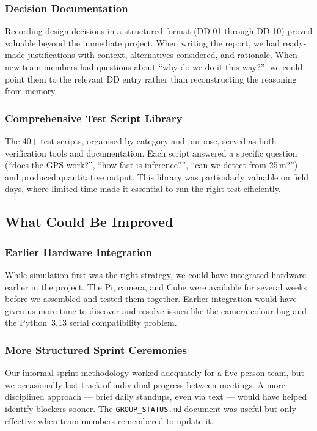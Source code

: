 \subsubsection{Decision Documentation}

Recording design decisions in a structured format (DD-01 through DD-10) proved valuable beyond the immediate project. When writing the report, we had ready-made justifications with context, alternatives considered, and rationale. When new team members had questions about ``why do we do it this way?'', we could point them to the relevant DD entry rather than reconstructing the reasoning from memory.

\subsubsection{Comprehensive Test Script Library}

The 40+ test scripts, organised by category and purpose, served as both verification tools and documentation. Each script answered a specific question (``does the GPS work?'', ``how fast is inference?'', ``can we detect from 25\,m?'') and produced quantitative output. This library was particularly valuable on field days, where limited time made it essential to run the right test efficiently.

\subsection{What Could Be Improved}

\subsubsection{Earlier Hardware Integration}

While simulation-first was the right strategy, we could have integrated hardware earlier in the project. The Pi, camera, and Cube were available for several weeks before we assembled and tested them together. Earlier integration would have given us more time to discover and resolve issues like the camera colour bug and the Python~3.13 serial compatibility problem.

\subsubsection{More Structured Sprint Ceremonies}

Our informal sprint methodology worked adequately for a five-person team, but we occasionally lost track of individual progress between meetings. A more disciplined approach --- brief daily standups, even via text --- would have helped identify blockers sooner. The \texttt{GROUP\_STATUS.md} document was useful but only effective when team members remembered to update it.

